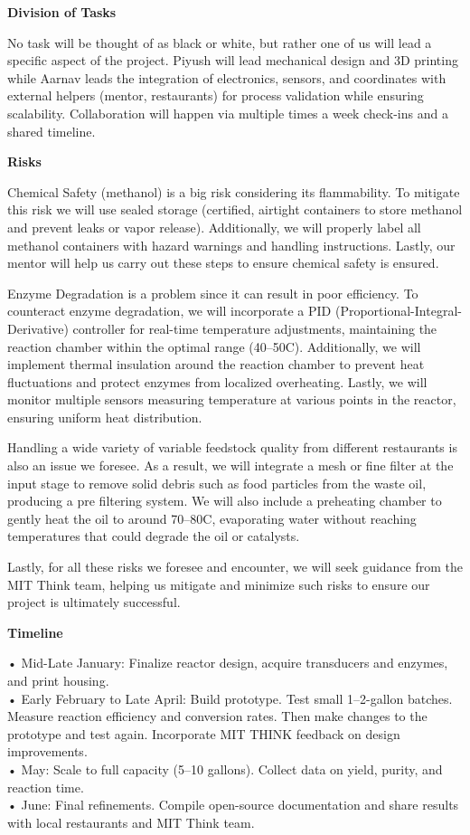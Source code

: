 \documentclass[10pt,twocolumn]{article}
\begin{document}
\textbf{Division of Tasks}

No task will be thought of as black or white, but rather one of us will lead a specific aspect of the project. Piyush will lead mechanical design and 3D printing while Aarnav leads the integration of electronics, sensors, and coordinates with external helpers (mentor, restaurants) for process validation while ensuring scalability. Collaboration will happen via multiple times a week check-ins and a shared timeline.

\textbf{Risks}

Chemical Safety (methanol) is a big risk considering its flammability. To mitigate this risk we will use sealed storage (certified, airtight containers to store methanol and prevent leaks or vapor release). Additionally, we will properly label all methanol containers with hazard warnings and handling instructions. Lastly, our mentor will help us carry out these steps to ensure chemical safety is ensured.

Enzyme Degradation is a problem since it can result in poor efficiency. To counteract enzyme degradation, we will incorporate a PID (Proportional-Integral-Derivative) controller for real-time temperature adjustments, maintaining the reaction chamber within the optimal range (40–50\degree C). Additionally, we will implement thermal insulation around the reaction chamber to prevent heat fluctuations and protect enzymes from localized overheating. Lastly, we will monitor multiple sensors measuring temperature at various points in the reactor, ensuring uniform heat distribution.

Handling a wide variety of variable feedstock quality from different restaurants is also an issue we foresee. As a result, we will integrate a mesh or fine filter at the input stage to remove solid debris such as food particles from the waste oil, producing a pre filtering system. We will also include a preheating chamber to gently heat the oil to around 70–80\degree C, evaporating water without reaching temperatures that could degrade the oil or catalysts.

Lastly, for all these risks we foresee and encounter, we will seek guidance from the MIT Think team, helping us mitigate and minimize such risks to ensure our project is ultimately successful.

\textbf{Timeline}

• Mid-Late January: Finalize reactor design, acquire transducers and enzymes, and print housing.\\
• Early February to Late April: Build prototype. Test small 1–2-gallon batches. Measure reaction efficiency and conversion rates. Then make changes to the prototype and test again. Incorporate MIT THINK feedback on design improvements.\\
• May: Scale to full capacity (5–10 gallons). Collect data on yield, purity, and reaction time.\\
• June: Final refinements. Compile open-source documentation and share results with local restaurants and MIT Think team.
\end{document}
